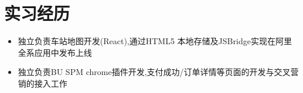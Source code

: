 \documentclass{resume}
\begin{document}

\section{实习经历}
\begin{itemize}
  \item 独立负责车站地图开发(React),通过HTML5 本地存储及JSBridge实现在阿里全系应用中发布上线
  \item 独立负责BU SPM chrome插件开发,支付成功/订单详情等页面的开发与交叉营销的接入工作
\end{itemize}




\end{document}
